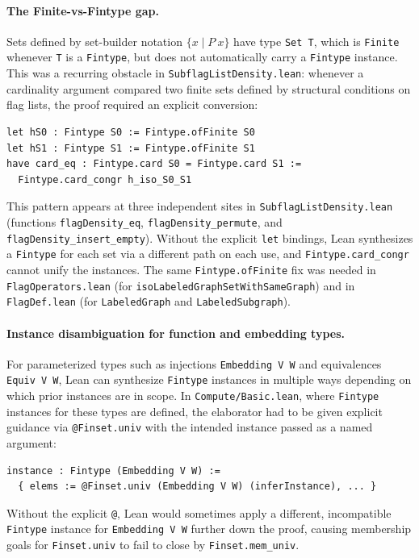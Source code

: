 \documentclass{article}
\newcommand{\lean}[1]{\texttt{#1}}
\begin{document}
\paragraph{The Finite-vs-Fintype gap.}
Sets defined by set-builder notation $\{x \mid P\ x\}$ have type
\lean{Set T}, which is \lean{Finite} whenever \lean{T} is a \lean{Fintype},
but does not automatically carry a \lean{Fintype} instance.  This was a
recurring obstacle in \lean{SubflagListDensity.lean}: whenever a cardinality
argument compared two finite sets defined by structural conditions on flag lists,
the proof required an explicit conversion:
\begin{lstlisting}
let hS0 : Fintype S0 := Fintype.ofFinite S0
let hS1 : Fintype S1 := Fintype.ofFinite S1
have card_eq : Fintype.card S0 = Fintype.card S1 :=
  Fintype.card_congr h_iso_S0_S1
\end{lstlisting}
This pattern appears at three independent sites in \lean{SubflagListDensity.lean}
(functions \lean{flagDensity\_eq}, \lean{flagDensity\_permute}, and
\lean{flagDensity\_insert\_empty}).  Without the explicit \lean{let} bindings,
Lean synthesizes a \lean{Fintype} for each set via a different path on each
use, and \lean{Fintype.card\_congr} cannot unify the instances.  The same
\lean{Fintype.ofFinite} fix was needed in \lean{FlagOperators.lean} (for
\lean{isoLabeledGraphSetWithSameGraph}) and in \lean{FlagDef.lean} (for
\lean{LabeledGraph} and \lean{LabeledSubgraph}).

\paragraph{Instance disambiguation for function and embedding types.}
For parameterized types such as injections \lean{Embedding V W} and equivalences
\lean{Equiv V W}, Lean can synthesize \lean{Fintype} instances in multiple ways
depending on which prior instances are in scope.  In
\lean{Compute/Basic.lean}, where \lean{Fintype} instances for these types are
defined, the elaborator had to be given explicit guidance via
\lean{@Finset.univ} with the intended instance passed as a named argument:
\begin{lstlisting}
instance : Fintype (Embedding V W) :=
  { elems := @Finset.univ (Embedding V W) (inferInstance), ... }
\end{lstlisting}
Without the explicit \lean{@}, Lean would sometimes apply a different,
incompatible \lean{Fintype} instance for \lean{Embedding V W} further down the proof,
causing membership goals for \lean{Finset.univ} to fail to close by
\lean{Finset.mem\_univ}.
\end{document}
